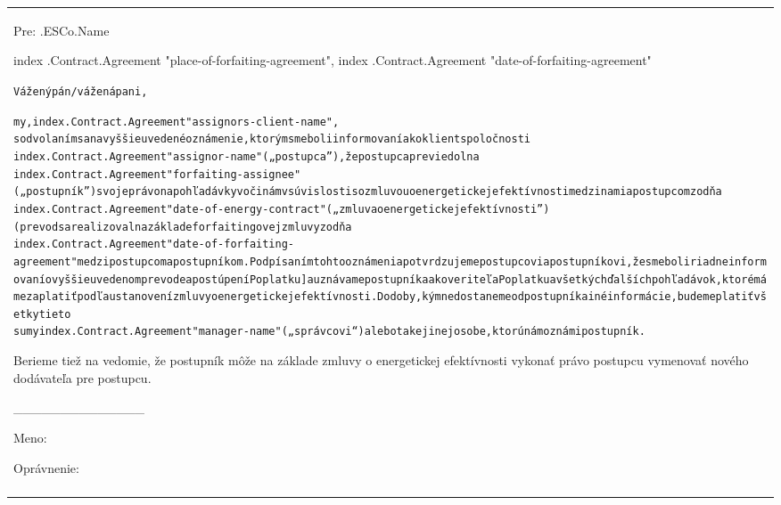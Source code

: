 \documentclass[a4paper]{article}
\begin{document}
\pagebreak

\begin{tabu}{|X|} \tabucline{}

  Pre:  {{.ESCo.Name}} \par

  \begin{flushright}
     {{index .Contract.Agreement "place-of-forfaiting-agreement"}},  {{index .Contract.Agreement "date-of-forfaiting-agreement"}} \par
  \end{flushright}

\begin{alltt}
 Vážený pán/vážená pani,


my, {{index .Contract.Agreement "assignors-client-name"}}, 
s odvolaním sa na vyššie uvedené oznámenie, ktorým sme boli informovaní ako klient spoločnosti 
{{index .Contract.Agreement "assignor-name"}} („postupca”), že postupca previedol na 
{{index .Contract.Agreement "forfaiting-assignee"}} („postupník”) svoje právo na pohľadávky voči nám v súvislosti so zmluvou o energetickej efektívnosti medzi nami a postupcom zo dňa 
{{index .Contract.Agreement "date-of-energy-contract"}} („zmluva o energetickej efektívnosti”) (prevod sa realizoval na základe forfaitingovej zmluvy zo dňa 
{{index .Contract.Agreement "date-of-forfaiting-agreement"}} medzi postupcom a postupníkom. Podpísaním tohto oznámenia potvrdzujeme postupcovi a postupníkovi, že sme boli riadne informovaní o vyššie uvedenom prevode a postúpení Poplatku] a uznávame postupníka ako veriteľa Poplatku a všetkých ďalších pohľadávok, ktoré máme zaplatiť podľa ustanovení zmluvy o energetickej efektívnosti. Do doby, kým nedostaneme od postupníka iné informácie, budeme platiť všetky tieto 
sumy {{index .Contract.Agreement "manager-name"}} („správcovi“) alebo takej inej osobe, ktorú nám oznámi postupník. 
\end{alltt}

  \vspace{2mm}

  Berieme tiež na vedomie, že postupník môže na základe zmluvy o energetickej efektívnosti vykonať právo postupcu vymenovať nového dodávateľa pre postupcu.

  \vspace{2cm}

  \begin{flushright}
    {\_\_\_\_\_\_\_\_\_\_\_\_\_\_} \par
    Meno: \par
    Oprávnenie: \par
  \end{flushright}

  \vspace{1cm} \\\tabucline{}

\end{tabu}
\end{document}
